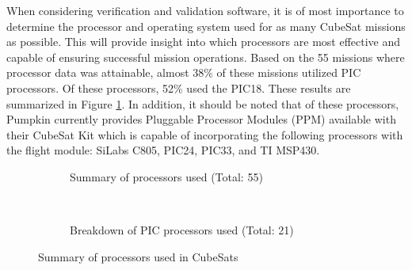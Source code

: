 \documentclass[11pt]{article}
\begin{document}
When considering verification and validation software, it is of most importance to determine the processor and operating system used for as many CubeSat missions as possible.  This will provide insight into which processors are most effective and capable of ensuring successful mission operations.  Based on the 55 missions where processor data was attainable, almost 38\% of these missions utilized PIC processors.  Of these processors, 52\% used the PIC18.  These results are summarized in Figure \ref{processors}.  In addition, it should be noted that of these processors, Pumpkin currently provides Pluggable Processor Modules (PPM) available with their CubeSat Kit which is capable of incorporating the following processors with the flight module:  SiLabs C805, PIC24, PIC33, and TI MSP430.  

\begin{figure}[h!]
    \centering
    \begin{subfigure}[t]{0.5\textwidth}
        \centering
        \caption{Summary of processors used (Total: 55)}
    \end{subfigure}%
    ~ 
    \begin{subfigure}[t]{0.5\textwidth}
        \centering
        \caption{Breakdown of PIC processors used (Total: 21)}
    \end{subfigure}
    \caption{Summary of processors used in CubeSats}
		\label{processors}
\end{figure}
\end{document}
